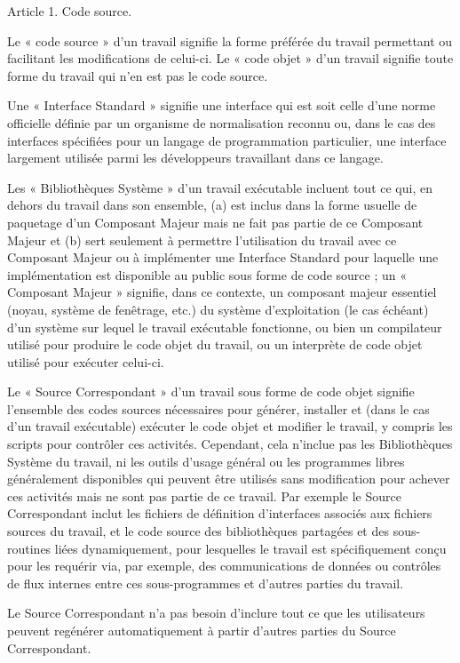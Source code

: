 {Article 1. Code source.

Le « code source » d’un travail signifie la forme préférée du travail
permettant ou facilitant les modifications de celui-ci. Le « code
objet » d’un travail signifie toute forme du travail qui n’en est pas
le code source.

Une « Interface Standard » signifie une interface qui est soit celle
d’une norme officielle définie par un organisme de normalisation
reconnu ou, dans le cas des interfaces spécifiées pour un langage de
programmation particulier, une interface largement utilisée parmi les
développeurs travaillant dans ce langage.

Les « Bibliothèques Système » d’un travail exécutable incluent tout ce
qui, en dehors du travail dans son ensemble, (a) est inclus dans la
forme usuelle de paquetage d’un Composant Majeur mais ne fait pas
partie de ce Composant Majeur et (b) sert seulement à permettre
l’utilisation du travail avec ce Composant Majeur ou à implémenter une
Interface Standard pour laquelle une implémentation est disponible au
public sous forme de code source ; un « Composant Majeur » signifie,
dans ce contexte, un composant majeur essentiel (noyau, système de
fenêtrage, etc.) du système d’exploitation (le cas échéant) d’un
système sur lequel le travail exécutable fonctionne, ou bien un
compilateur utilisé pour produire le code objet du travail, ou un
interprète de code objet utilisé pour exécuter celui-ci.

Le « Source Correspondant » d’un travail sous forme de code objet
signifie l’ensemble des codes sources nécessaires pour générer,
installer et (dans le cas d’un travail exécutable) exécuter le code
objet et modifier le travail, y compris les scripts pour contrôler ces
activités. Cependant, cela n’inclue pas les Bibliothèques Système du
travail, ni les outils d’usage général ou les programmes libres
généralement disponibles qui peuvent être utilisés sans modification
pour achever ces activités mais ne sont pas partie de ce travail. Par
exemple le Source Correspondant inclut les fichiers de définition
d’interfaces associés aux fichiers sources du travail, et le code
source des bibliothèques partagées et des sous-routines liées
dynamiquement, pour lesquelles le travail est spécifiquement conçu pour
les requérir via, par exemple, des communications de données ou
contrôles de flux internes entre ces sous-programmes et d’autres
parties du travail.

Le Source Correspondant n’a pas besoin d’inclure tout ce que les
utilisateurs peuvent regénérer automatiquement à partir d’autres
parties du Source Correspondant.

}

